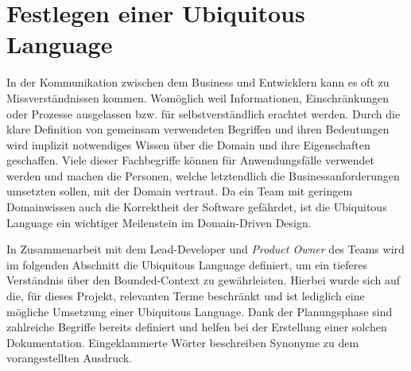 \section{Festlegen einer Ubiquitous Language}

In der Kommunikation zwischen dem Business und Entwicklern kann es oft zu Missverständnissen kommen. Womöglich weil Informationen, Einschränkungen oder Prozesse ausgelassen bzw. für selbstverständlich erachtet werden. Durch die klare Definition von gemeinsam verwendeten Begriffen und ihren Bedeutungen wird implizit notwendiges Wissen über die Domain und ihre Eigenschaften geschaffen. Viele dieser Fachbegriffe können für Anwendungsfälle verwendet werden und machen die Personen, welche letztendlich die Businessanforderungen umsetzten sollen, mit der Domain vertraut. Da ein Team mit geringem Domainwissen auch die Korrektheit der Software gefährdet, ist die Ubiquitous Language ein wichtiger Meilenstein im Domain-Driven Design. \cite[S. 335ff.]{Evans.2011}

In Zusammenarbeit mit dem Lead-Developer und \emph{\Gls{Product Owner}} des Teams wird im folgenden Abschnitt die Ubiquitous Language definiert, um ein tieferes Verständnis über den Bounded-Context zu gewährleisten. Hierbei wurde sich auf die, für dieses Projekt, relevanten Terme beschränkt und ist lediglich eine mögliche Umsetzung einer Ubiquitous Language. Dank der Planungsphase sind zahlreiche Begriffe bereits definiert und helfen bei der Erstellung einer solchen Dokumentation. Eingeklammerte Wörter beschreiben Synonyme zu dem vorangestellten Ausdruck.

